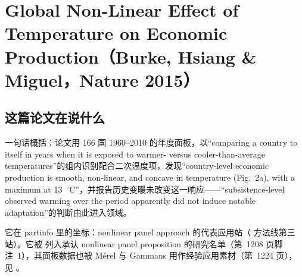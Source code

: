 
\chapter{Global Non-Linear Effect of Temperature on Economic Production（Burke, Hsiang \& Miguel，Nature 2015）}
\label{ch:burke-hsiang-miguel-2015}

\section{这篇论文在说什么}

一句话概括：论文用 166 国 1960--2010 的年度面板，以``comparing a country to itself in years when it is exposed to warmer- versus cooler-than-average temperatures''\citep[第~236 页]{burke2015global}的组内识别配合二次温度项，发现``country-level economic production is smooth, non-linear, and concave in temperature (Fig.~2a), with a maximum at 13~$^\circ$C''\citep[第~236 页]{burke2015global}，并报告历史变暖未改变这一响应——``subsistence-level observed warming over the period apparently did not induce notable adaptation''\citep[第~237 页，措辞见下文结果节]{burke2015global}的判断由此进入领域。

它在 partinfo 里的坐标：nonlinear panel approach 的代表应用站（ 方法线第三站）。它被 \citet{merel2021climate} 列入承认 nonlinear panel proposition 的研究名单（第~1208 页脚注~1），其面板数据也被 Mérel 与 Gammans 用作经验应用素材（第~1224 页），见 。


